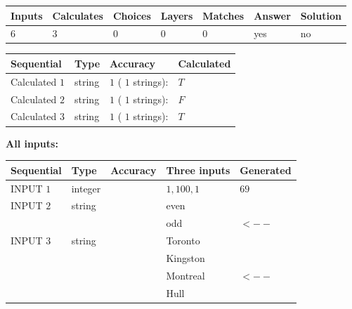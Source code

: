 \documentclass[12pt]{article}
\begin{document}
   
\noindent\begin{tabular}{|l|l|l|l|l|l|l|}
 \hline
Inputs & Calculates & Choices & Layers & Matches & Answer & Solution \\ \hline
           6  & 
           3  & 
           0
  & 
           0  & 
           0  & 
  yes & 
  no 
  \\ \hline
 \end{tabular}
   
   
   
   
\noindent{}
   
   
  
  
\noindent\begin{tabular}{|l|l|l|l|}
\hline
 Sequential & Type & Accuracy & Calculated \\ 
\hline
 
 
  Calculated $            1 $ & string & $            1  $ ( $           1  $ strings): 
 & $T$
 \\  \hline  
 
 
  Calculated $            2 $ & string & $            1  $ ( $           1  $ strings): 
 & $F$
 \\  \hline  
 
 
  Calculated $            3 $ & string & $            1  $ ( $           1  $ strings): 
 & $T$
 \\  \hline  
 \end{tabular}
   
   
   
   
\noindent\vspace{0.1in}\hspace{-0.08in} {\textbf{\Large{All inputs: }}}
   
   
  
  
\noindent\begin{tabular}{|l|l|l|l|l|}
\hline
 Sequential & Type & Accuracy & Three inputs & Generated \\ 
\hline
 
 
  INPUT $            1 $ & integer &  & $
 1
 , 
 100
 , 
 1
 $ & $ 69 $ 
 \\  \hline  
 
 
  INPUT $            2 $ & string & & 
 even & 
  \\
  & & & 
 odd & 
  $ <-- $ 
 \\  \hline  
 
 
  INPUT $            3 $ & string & & 
 Toronto & 
  \\
  & & & 
 Kingston & 
  \\
  & & & 
 Montreal & 
  $ <-- $ 
  \\
  & & & 
 Hull & 
 \\  \hline  
 \end{tabular}
   
\end{document}
